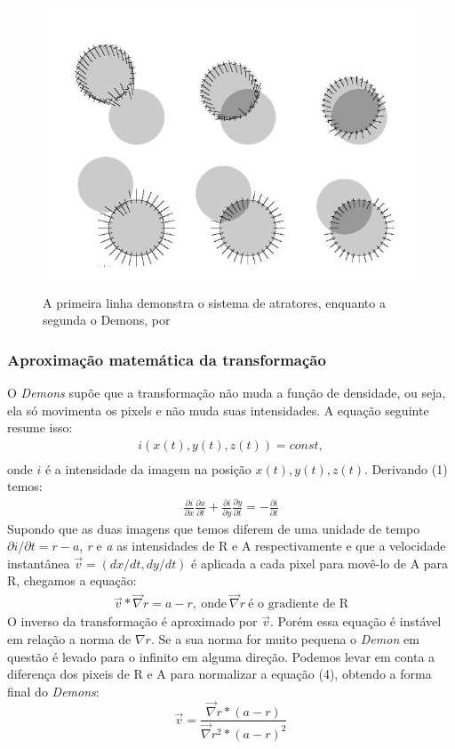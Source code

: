 \begin{figure}[H]
    \centering
    \includegraphics[width=1\textwidth]{figuras/demons.jpg}
    \caption{A primeira linha demonstra o sistema de atratores, enquanto a segunda o Demons, por \citep{thirion1995fast}}
    \label{fig:demons}
\end{figure}

\subsubsection{Aproximação matemática da transformação}
    O \textit{Demons} supõe que a transformação não muda a função de densidade, ou seja, ela só movimenta os pixels e não muda
suas intensidades. A equação seguinte resume isso:
\begin{align}
    i(x(t),y(t),z(t)) = const, \\
\end{align}
    onde $i$ é a intensidade da imagem na posição $x(t),y(t),z(t)$. Derivando (1) temos:
\begin{align}
    \frac{\partial i}{\partial x} \frac{\partial x}{\partial t} +
    \frac{\partial i}{\partial y} \frac{\partial y}{\partial t} = - \frac{\partial i}{\partial t}
\end{align}
    Supondo que as duas imagens que temos diferem de uma unidade de tempo $\partial i/\partial t = 
r-a$, \textit{r} e \textit{a} as intensidades de R e A respectivamente e que a velocidade instantânea 
$\vec{v} = (dx/dt,dy/dt)$ é aplicada a cada pixel para movê-lo de A para R, chegamos a equação:
\begin{align}
    \vec{v}*\vec{\nabla}r = a - r, \ \text{onde} \ \vec{\nabla} r \ \text{é o gradiente de R}
\end{align}
    O inverso da transformação é aproximado por $\vec{v}$. Porém essa equação é instável em relação a norma de $\nabla 
r$. Se a sua norma for muito pequena o \textit{Demon} em questão é levado para o infinito em alguma direção. Podemos levar em 
conta a diferença dos pixeis de R e A para normalizar a equação (4), obtendo a forma final do \textit{Demons}:
\begin{equation}
    \vec{v} = \frac{\vec{\nabla}r * (a - r)}{\vec{\nabla}r^2 * (a - r)^2}
\end{equation}

